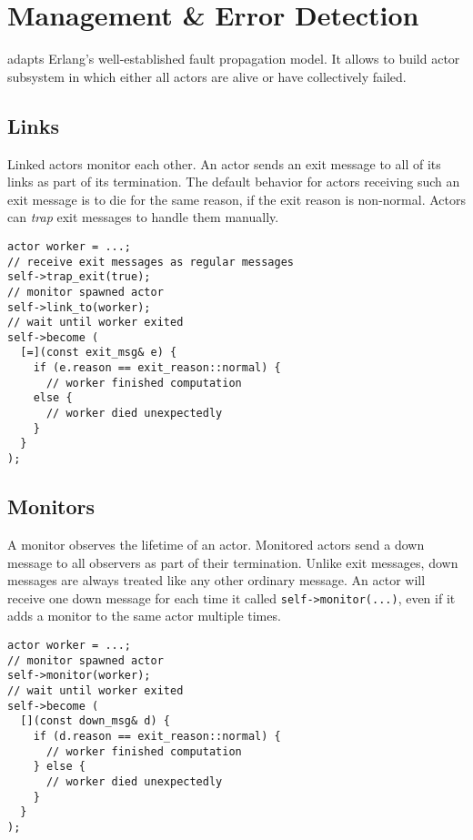 \section{Management \& Error Detection}

\lib adapts Erlang's well-established fault propagation model.
It allows to build actor subsystem in which either all actors are alive or have collectively failed.

\subsection{Links}

Linked actors monitor each other.
An actor sends an exit message to all of its links as part of its termination.
The default behavior for actors receiving such an exit message is to die for the same reason, if the exit reason is non-normal.
Actors can \textit{trap} exit messages to handle them manually.

\begin{lstlisting}
actor worker = ...;
// receive exit messages as regular messages
self->trap_exit(true);
// monitor spawned actor
self->link_to(worker);
// wait until worker exited
self->become (
  [=](const exit_msg& e) {
    if (e.reason == exit_reason::normal) {
      // worker finished computation
    else {
      // worker died unexpectedly
    }
  }
);
\end{lstlisting}

\subsection{Monitors}
\label{Sec::Management::Monitors}

A monitor observes the lifetime of an actor.
Monitored actors send a down message to all observers as part of their termination.
Unlike exit messages, down messages are always treated like any other ordinary message.
An actor will receive one down message for each time it called \lstinline^self->monitor(...)^, even if it adds a monitor to the same actor multiple times.

\begin{lstlisting}
actor worker = ...;
// monitor spawned actor
self->monitor(worker);
// wait until worker exited
self->become (
  [](const down_msg& d) {
    if (d.reason == exit_reason::normal) {
      // worker finished computation
    } else {
      // worker died unexpectedly
    }
  }
);
\end{lstlisting}

